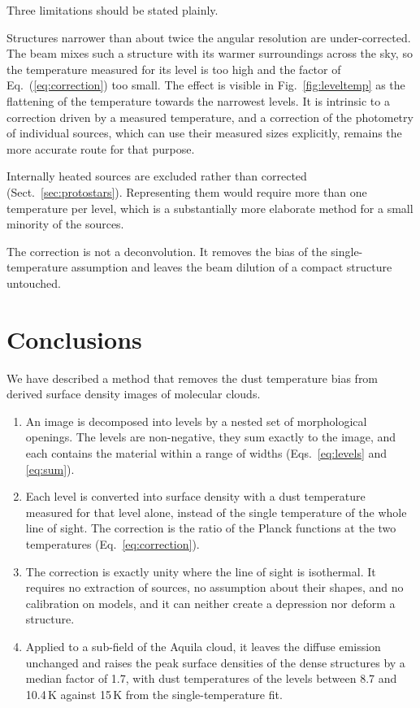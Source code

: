 \documentclass{aa}
\begin{document}
Three limitations should be stated plainly.

Structures narrower than about twice the angular resolution are
under-corrected. The beam mixes such a structure with its warmer surroundings
across the sky, so the temperature measured for its level is too high and the
factor of Eq.~(\ref{eq:correction}) too small. The effect is visible in
Fig.~\ref{fig:leveltemp} as the flattening of the temperature towards the
narrowest levels. It is intrinsic to a correction driven by a measured
temperature, and a correction of the photometry of individual sources, which
can use their measured sizes explicitly, remains the more accurate route for
that purpose.

Internally heated sources are excluded rather than corrected
(Sect.~\ref{sec:protostars}). Representing them would require more than one
temperature per level, which is a substantially more elaborate method for a
small minority of the sources.

The correction is not a deconvolution. It removes the bias of the
single-temperature assumption and leaves the beam dilution of a compact
structure untouched.

\section{Conclusions}
\label{sec:conclusions}

We have described a method that removes the dust temperature bias from derived
surface density images of molecular clouds.

\begin{enumerate}
\item An image is decomposed into levels by a nested set of morphological
      openings. The levels are non-negative, they sum exactly to the image, and
      each contains the material within a range of widths
      (Eqs.~\ref{eq:levels} and \ref{eq:sum}).
\item Each level is converted into surface density with a dust temperature
      measured for that level alone, instead of the single temperature of the
      whole line of sight. The correction is the ratio of the Planck functions
      at the two temperatures (Eq.~\ref{eq:correction}).
\item The correction is exactly unity where the line of sight is isothermal. It
      requires no extraction of sources, no assumption about their shapes, and
      no calibration on models, and it can neither create a depression nor
      deform a structure.
\item Applied to a sub-field of the Aquila cloud, it leaves the diffuse
      emission unchanged and raises the peak surface densities of the dense
      structures by a median factor of 1.7, with dust temperatures of the levels
      between 8.7 and 10.4\,K against 15\,K from the single-temperature fit.
\end{enumerate}
\end{document}
